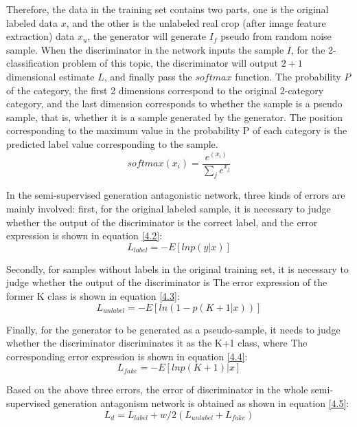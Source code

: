 \documentclass[11pt,en]{elegantpaper}
\begin{document}
Therefore, the data in the training set contains two parts, one is the original labeled data $x$, and the other is the unlabeled real crop (after image feature extraction) data $x_u$, the generator will generate $I_f$ pseudo from random noise sample. When the discriminator in the network inputs the sample $I$, for the 2-classification problem of this topic, the discriminator will output $2+1$ dimensional estimate $L$, and finally pass the $softmax$ function. The probability $P$ of the category, the first 2 dimensions correspond to the original 2-category category, and the last dimension corresponds to whether the sample is a pseudo sample, that is, whether it is a sample generated by the generator. The position corresponding to the maximum value in the probability P of each category is the predicted label value corresponding to the sample.
\begin{equation}
	softmax(x_i)=\frac{e^{(x_i)}}{\sum_j e^{x_j}} \label{4.1}
\end{equation}

In the semi-supervised generation antagonistic network, three kinds of errors are mainly involved: first, for the original labeled sample, it is necessary to judge whether the output of the discriminator is the correct label, and the error expression is shown in equation \ref{4.2}:
\begin{equation}
	L_{label}=-E[ln p(y|x)] \label{4.2}
\end{equation}

Secondly, for samples without labels in the original training set, it is necessary to judge whether the output of the discriminator is The error expression of the former K class is shown in equation \ref{4.3}:
\begin{equation}
	L_{unlabel}=-E[ln(1-p(K+1|x))] \label{4.3}
\end{equation}

Finally, for the generator to be generated as a pseudo-sample, it needs to judge whether the discriminator discriminates it as the K+1 class, where
The corresponding error expression is shown in equation \ref{4.4}:
\begin{equation}
	L_{fake}=-E[lnp(K+1)|x] \label{4.4}
\end{equation}

Based on the above three errors, the error of discriminator in the whole semi-supervised generation antagonism network is obtained as shown in equation \ref{4.5}:
\begin{equation}
	L_d=L_{label}+w/2(L_{unlabel}+L_{fake}) \label{4.5}
\end{equation}
\end{document}
